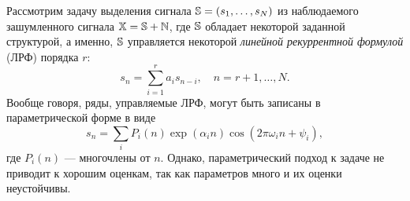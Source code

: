 \documentclass[12pt, specialist, subf,href,colorlinks=true,substylefile = spbu.rtx]{disser}
\theoremstyle{remark}
\theoremstyle{definition}
\begin{document}

Рассмотрим задачу выделения сигнала $\mathbb{S} = (s_1, \ldots, s_N)$ из наблюдаемого зашумленного сигнала $\mathbb{X} = \mathbb{S} + \mathbb{N}$, где $\mathbb{S}$  обладает некоторой заданной структурой, а именно, $\mathbb{S}$ управляется некоторой \emph{линейной рекуррентной формулой} (ЛРФ) порядка $r$:
\begin{equation*}
s_n = \sum_{i = 1}^{r} a_i s_{n-i}, \quad n = r + 1, \ldots, N.
\end{equation*}
Вообще говоря, ряды, управляемые ЛРФ, могут быть записаны в параметрической форме в виде 
\begin{equation} \label{parametricform}
s_n = \sum_i P_i(n) \exp(\alpha_i n) \cos(2 \pi \omega_i n + \psi_i),
\end{equation}
где $P_i(n)$ --- многочлены от $n$.
Однако, параметрический подход к задаче не приводит к хорошим оценкам, так как параметров много и их оценки неустойчивы.
\end{document}
